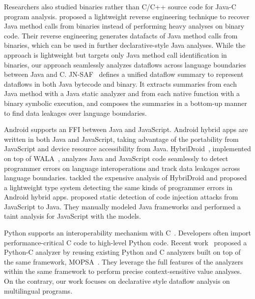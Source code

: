 Researchers also studied binaries rather than C/C++ source code
for Java-C program analysis.  \citet{scanning} proposed a lightweight reverse engineering technique to
recover Java method calls from binaries instead of performing heavy analyses on
binary code.  Their reverse engineering generates datafacts of Java method
calls from binaries, which can be used in further declarative-style Java
analyses. While the approach is lightweight but targets only Java method call
identification in binaries, our approach seamlessly analyzes dataflows across language
boundaries between Java and C.  JN-SAF~\cite{JN-SAF} defines a
unified dataflow summary to represent dataflows in both Java bytecode and
binary.  It extracts summaries from each Java method with a Java static
analyzer and from each native function with a binary symbolic execution, and
composes the summaries in a bottom-up manner to find data leakages over
language boundaries.

Android supports an FFI between Java and JavaScript.  Android hybrid apps are
written in both Java and JavaScript, taking advantage of the portability from
JavaScript and device resource accessibility from Java.
HybriDroid~\cite{hybridroid}, implemented on top of WALA~\cite{WALA}, analyzes
Java and JavaScript code seamlessly to detect programmer errors on language
interoperations and track data leakages across language boundaries.
\citet{BaeICSE19} tackled the expensive analysis of HybriDroid and proposed
a lightweight type system detecting the same kinds of programmer errors in
Android hybrid apps.  \citet{jin2014code} proposed static detection
of code injection attacks from JavaScript to Java.  They manually
modeled Java frameworks and performed a taint analysis for JavaScript with the models.


Python supports an interoperability mechanism with C~\cite{PythonC}.
Developers often import performance-critical C code to high-level Python code.
Recent work~\cite{sas2021} proposed a Python-C analyzer by reusing existing
Python and C analyzers built on top of the same framework, MOPSA~\cite{Mopsa}.
They leverage the full features of the analyzers within the same framework to
perform precise context-sensitive value analyses. 
On the contrary, our work focuses on declarative style dataflow analysis on
multilingual programs. 
